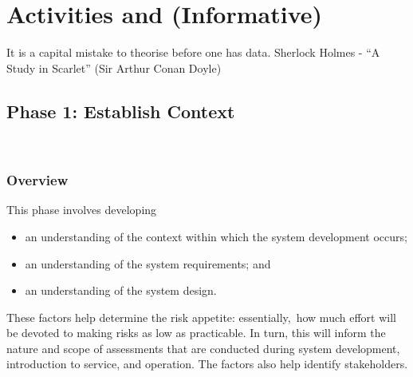 %
%
\section{Activities and  (Informative)}\label{bkm:activitiestailoring}

\dsiwgSectionQuote
  {It is a capital mistake to theorise before one has data.}
  {Sherlock Holmes - ``A Study in Scarlet'' (Sir Arthur Conan Doyle)}


\cbstart\subsection{Phase 1: Establish Context}\cbend\
\subsubsection{Overview}
This phase involves developing
\cbstart
\begin{itemize}
	\item an understanding of the context within which the system development occurs; 
	\item an understanding of the system requirements; and 
	\item an understanding of the system design.
\end{itemize}
\cbend

These factors help determine the risk appetite\cbstart: essentially,\cbend\ how much effort will be devoted to making risks as low as practicable. In turn, this will inform the nature and scope of assessments that are conducted during system development, introduction to service, and operation. The factors also help identify \glspl{stakeholder}.

